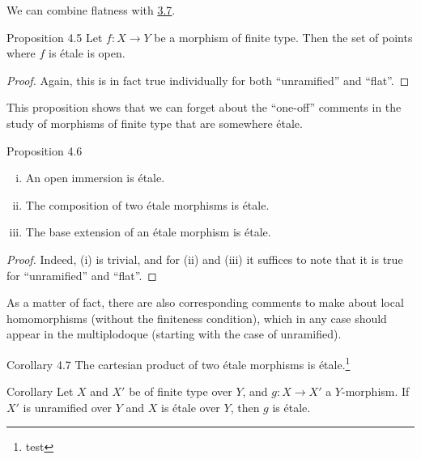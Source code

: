 We can combine flatness with \hyperref[I.3.7]{3.7}.

\begin{itenv}{Proposition 4.5}
\label{I.4.5}
  Let $f\colon X\to Y$ be a morphism of finite type.
  Then the set of points where $f$ is étale is open.
\end{itenv}

\begin{proof}
  Again, this is in fact true individually for both ``unramified'' and ``flat''.
\end{proof}

This proposition shows that we can forget about the ``one-off'' comments in the study of morphisms of finite type that are somewhere étale.

\begin{itenv}{Proposition 4.6}
\label{I.4.6}
  \begin{enumerate}[(i)]
    \item An open immersion is étale.
    \item The composition of two étale morphisms is étale.
    \item The base extension of an étale morphism is étale.
  \end{enumerate}
\end{itenv}

\begin{proof}
  Indeed, (i) is trivial, and for (ii) and (iii) it suffices to note that it is true for ``unramified'' and ``flat''.
\end{proof}

As a matter of fact, there are also corresponding comments to make about local homomorphisms (without the finiteness condition), which in any case should appear in the multiplodoque
(starting with the case of unramified).

\begin{itenv}{Corollary 4.7}
\label{I.4.7}
  The cartesian product of two étale morphisms is étale.\footnote{test}
\end{itenv}

\begin{itenv}{Corollary}
\label{I.4.8}
  Let $X$ and $X'$ be of finite type over $Y$, and $g\colon X\to X'$ a $Y$-morphism.
  If $X'$ is unramified over $Y$ and $X$ is étale over $Y$, then $g$ is étale.
\end{itenv}

